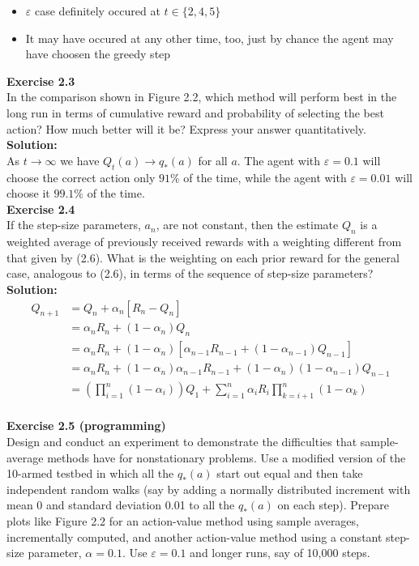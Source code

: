 \begin{itemize}
    \item $\varepsilon$ case definitely occured at $t \in \{2,4,5\}$
    \item It may have occured at any other time, too, just by chance the agent may have choosen the greedy step
\end{itemize} 

\textbf{Exercise 2.3} \\
In the comparison shown in Figure 2.2, which method will perform best in
the long run in terms of cumulative reward and probability of selecting the best action?
How much better will it be? Express your answer quantitatively.\\

\textbf{Solution:}\\
As $t \to \infty$ we have $Q_t(a) \to q_*(a)$ for all $a$. The agent with $\varepsilon=0.1$ will choose the correct action only $91\%$ of the time, while the agent with $\varepsilon=0.01$ will choose it $99.1\%$ of the time.\\

\textbf{Exercise 2.4} \\
If the step-size parameters, $a_n$, are not constant, then the estimate $Q_n$ is
a weighted average of previously received rewards with a weighting different from that
given by (2.6). What is the weighting on each prior reward for the general case, analogous
to (2.6), in terms of the sequence of step-size parameters?\\

\textbf{Solution:}\\
\begin{equation}
    \begin{aligned}
        Q_{n+1} &= Q_n + \alpha_n \left[ R_n - Q_n \right] \\
        &= \alpha_n  R_n + (1-\alpha_n) Q_n \\
        &= \alpha_n  R_n + (1-\alpha_n) \left[ \alpha_{n-1}  R_{n-1} + (1-\alpha_{n-1}) Q_{n-1} \right] \\
        &= \alpha_n  R_n + (1-\alpha_n) \alpha_{n-1}  R_{n-1} + (1-\alpha_n) (1-\alpha_{n-1}) Q_{n-1} \\
        &= \left( \prod_{i=1}^{n} (1-\alpha_i) \right) Q_1 + \sum_{i=1}^{n} \alpha_i R_i \prod_{k=i+1}^{n} (1-\alpha_k) 
\end{aligned}
\end{equation}
\\

\textbf{Exercise 2.5 (programming)} \\
 Design and conduct an experiment to demonstrate the
difficulties that sample-average methods have for nonstationary problems. Use a modified
version of the 10-armed testbed in which all the $q_*(a)$ start out equal and then take
independent random walks (say by adding a normally distributed increment with mean 0
and standard deviation 0.01 to all the $q_*(a)$ on each step). Prepare plots like Figure 2.2
for an action-value method using sample averages, incrementally computed, and another
action-value method using a constant step-size parameter, $\alpha = 0.1$. Use $\varepsilon = 0.1$ and
longer runs, say of 10,000 steps. \\

